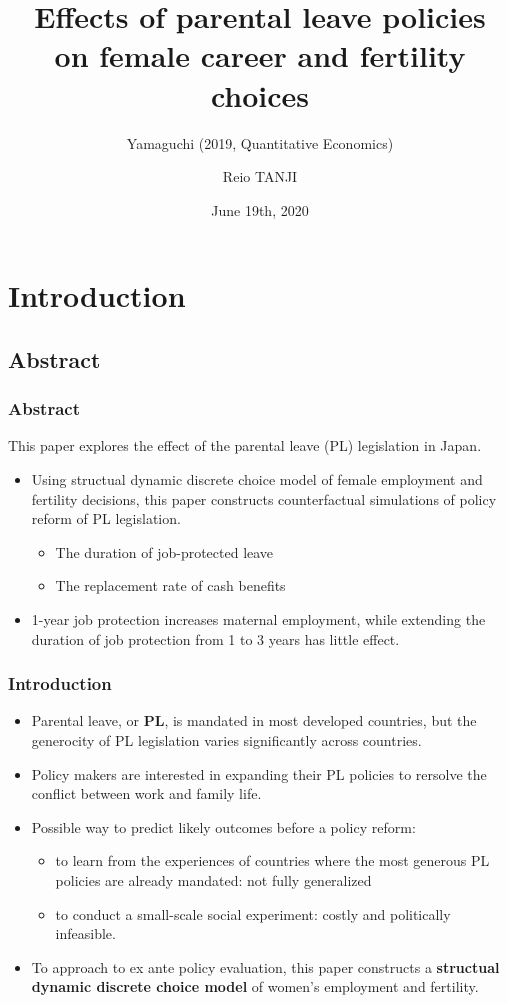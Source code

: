\documentclass[dvipdfmx,11pt]{beamer}
\title{Effects of parental leave policies \\ on female career and fertility choices}
\subtitle{Yamaguchi (2019, Quantitative Economics)}
\author{Reio TANJI}
\date{June 19th, 2020}
\institute{Osaka University, Graduate School of Economics}
\begin{document}
\begin{frame}\frametitle{}
\titlepage
\end{frame}

\section{Introduction}
\subsection{Abstract}

\begin{frame}\frametitle{Abstract}
  This paper explores the effect of the parental leave (PL) legislation in Japan.
  \begin{itemize}
    \item Using structual dynamic discrete choice model of female employment and fertility decisions, this paper constructs counterfactual simulations of policy reform of PL legislation.
    \begin{itemize}
      \item The duration of job-protected leave
      \item The replacement rate of cash benefits
    \end{itemize}
    \item 1-year job protection increases maternal employment, while extending the duration of job protection from 1 to 3 years has little effect.
  \end{itemize}
\end{frame}

\begin{frame}\frametitle{Introduction}
  \begin{itemize}
    \item Parental leave, or \textbf{PL}, is mandated in most developed countries, but the generocity of PL legislation varies significantly across countries.
    \item Policy makers are interested in expanding their PL policies to rersolve the conflict between work and family life.
    \item Possible way to predict likely outcomes before a policy reform:
    \begin{itemize}
      \item to learn from the experiences of countries where the most generous PL policies are already mandated: not fully generalized
      \item to conduct a small-scale social experiment: costly and politically infeasible.
    \end{itemize}
    \item To approach to ex ante policy evaluation, this paper constructs a \textbf{structual dynamic discrete choice model} of women's employment and fertility.
  \end{itemize}
\end{frame}
\end{document}
